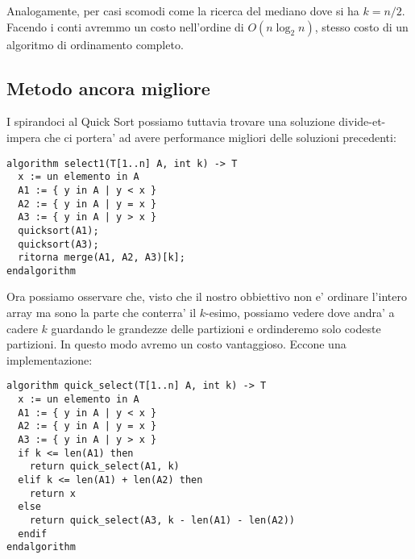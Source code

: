 \documentclass{article}
\begin{document}
Analogamente, per casi scomodi come la ricerca del mediano dove si ha $k = n/2$.
Facendo i conti avremmo un costo nell'ordine di $O(n \log_2 n)$, stesso costo di
un algoritmo di ordinamento completo.

\subsection{Metodo ancora migliore}

I spirandoci al Quick Sort possiamo tuttavia trovare una soluzione divide-et-impera
che ci portera' ad avere performance migliori delle soluzioni precedenti:

\begin{lstlisting}
algorithm select1(T[1..n] A, int k) -> T
  x := un elemento in A
  A1 := { y in A | y < x }
  A2 := { y in A | y = x }
  A3 := { y in A | y > x }
  quicksort(A1);
  quicksort(A3);
  ritorna merge(A1, A2, A3)[k];
endalgorithm
\end{lstlisting}

Ora possiamo osservare che, visto che il nostro obbiettivo non e' ordinare
l'intero array ma sono la parte che conterra' il $k$-esimo, possiamo vedere
dove andra' a cadere $k$ guardando le grandezze delle partizioni e ordinderemo
solo codeste partizioni. In questo modo avremo un costo vantaggioso.
Eccone una implementazione:

\begin{lstlisting}
algorithm quick_select(T[1..n] A, int k) -> T
  x := un elemento in A
  A1 := { y in A | y < x }
  A2 := { y in A | y = x }
  A3 := { y in A | y > x }
  if k <= len(A1) then
    return quick_select(A1, k)
  elif k <= len(A1) + len(A2) then
    return x
  else
    return quick_select(A3, k - len(A1) - len(A2))
  endif
endalgorithm
\end{lstlisting}
\end{document}
